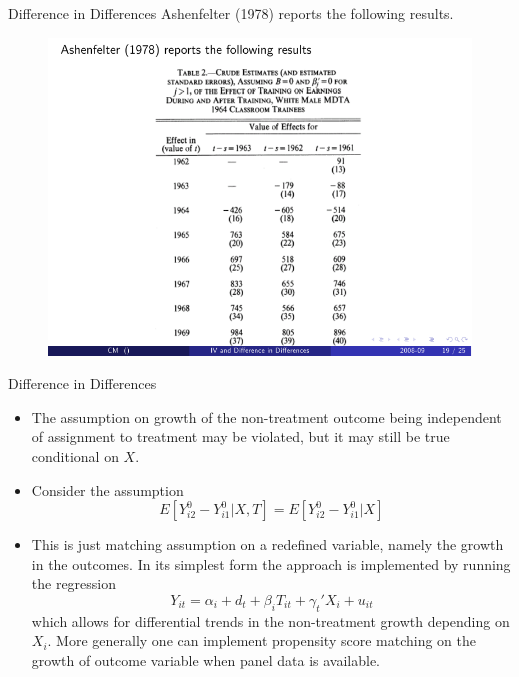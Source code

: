 \documentclass[xcolor=pdftex,dvipsnames,table,mathserif]{beamer}
\begin{document}
\begin{frame}{Difference in Differences}
Ashenfelter (1978) reports the following results.
\begin{figure}
\centering
\includegraphics[scale=.85]{./resources/ashefelter2.pdf}
\end{figure}
\end{frame}

\begin{frame}{Difference in Differences}
\begin{itemize}
\item The assumption on growth of the non-treatment outcome being independent of assignment to treatment may be violated, but it may still be true conditional on $X$.
\item Consider the assumption
$$ E[Y_{i2}^0- Y_{i1}^0 | X,T] = E[Y_{i2}^0- Y_{i1}^0 | X] $$ 
\item This is just matching assumption on a redefined variable, namely the growth in the outcomes. In its simplest form the approach is implemented by running the regression
$$ Y_{it} = \alpha_i + d_t + \beta_i T_{it} + \gamma_t' X_i + u_{it}$$ 
which allows for differential trends in the non-treatment growth depending on $X_i$. More generally one can implement propensity score matching on the growth of outcome variable when panel data is available.
\end{itemize}
\end{frame}
\end{document}
